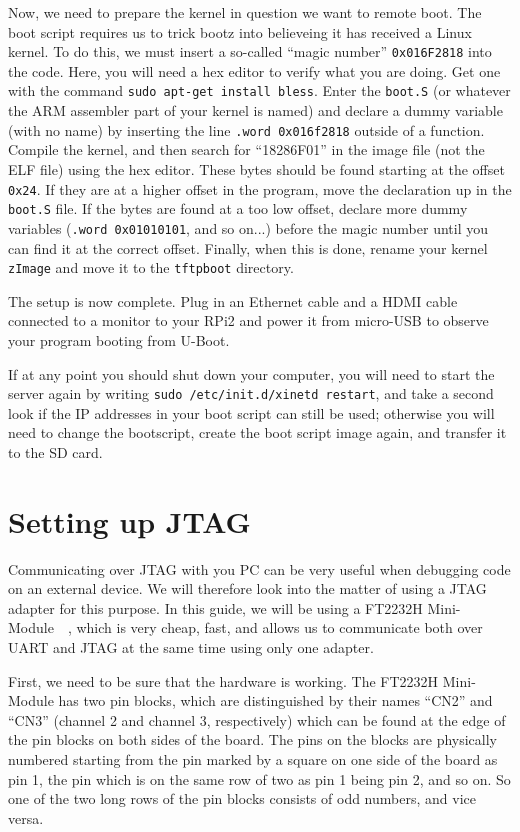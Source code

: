 \documentclass[a4paper,11pt,reqno]{amsart}
\begin{document}
{Now, we need to prepare the kernel in question we want to remote boot. The boot script requires us to trick bootz into believeing it has received a Linux kernel. To do this, we must insert a so-called ``magic number'' \texttt{0x016F2818} into the code. Here, you will need a hex editor to verify what you are doing. Get one with the command \texttt{sudo apt-get install bless}. Enter the \texttt{boot.S} (or whatever the ARM assembler part of your kernel is named) and declare a dummy variable (with no name) by inserting the line \texttt{.word 0x016f2818} outside of a function. Compile the kernel, and then search for ``18286F01'' in the image file (not the ELF file) using the hex editor. These bytes should be found starting at the offset \texttt{0x24}. If they are at a higher offset in the program, move the declaration up in the \texttt{boot.S} file. If the bytes are found at a too low offset, declare more dummy variables (\texttt{.word 0x01010101}, and so on...) before the magic number until you can find it at the correct offset. Finally, when this is done, rename your kernel \texttt{zImage} and move it to the \texttt{tftpboot} directory.

The setup is now complete. Plug in an Ethernet cable and a HDMI cable connected to a monitor to your RPi2 and power it from micro-USB to observe your program booting from U-Boot.

If at any point you should shut down your computer, you will need to start the server again by writing \texttt{sudo /etc/init.d/xinetd restart}, and take a second look if the IP addresses in your boot script can still be used; otherwise you will need to change the bootscript, create the boot script image again, and transfer it to the SD card.

\section{Setting up JTAG}
Communicating over JTAG with you PC can be very useful when debugging code on an external device. We will therefore look into the matter of using a JTAG adapter for this purpose. In this guide, we will be using a FT2232H Mini-Module~\cite{ft2232h}~\cite{ft2232hmm}, which is very cheap, fast, and allows us to communicate both over UART and JTAG at the same time using only one adapter.

First, we need to be sure that the hardware is working. The FT2232H Mini-Module has two pin blocks, which are distinguished by their names ``CN2'' and ``CN3'' (channel 2 and channel 3, respectively) which can be found at the edge of the pin blocks on both sides of the board. The pins on the blocks are physically numbered starting from the pin marked by a square on one side of the board as pin 1, the pin which is on the same row of two as pin 1 being pin 2, and so on. So one of the two long rows of the pin blocks consists of odd numbers, and vice versa.

}
\end{document}
